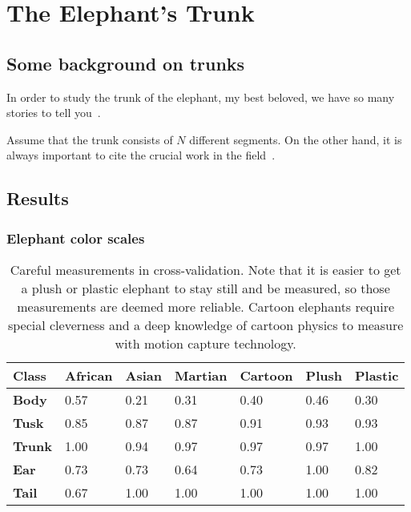 \chapter{The Elephant's Trunk} 

\label{chapter:chapter2}

\section{Some background on trunks} 

In order to study the trunk of the elephant, my best beloved, we have so many stories to tell you~\cite{kipling2010just}. 

Assume that the trunk consists of $N$ different segments. On the other hand, it is always important to cite the crucial work in the field~\cite{willems2007there}.


\section{Results} 


\subsection{Elephant color scales}

\begin{table}[htb!]
   \begin{center}
      \begin{tabular}{|l|l|l|l|l|l|l|} \hline
      {\bf Class} & {\bf African} & {\bf Asian}  & {\bf Martian}  & {\bf Cartoon}  & {\bf Plush} & {\bf Plastic} \\\hline
      {\bf Body} &  0.57  & 0.21 & 0.31 & 0.40 & 0.46 & 0.30 \\\hline
      {\bf Tusk} & 0.85 & 0.87 & 0.87 & 0.91 & 0.93 & 0.93 \\\hline
      {\bf Trunk} & 1.00  & 0.94 & 0.97 & 0.97 & 0.97 & 1.00 \\\hline
      {\bf Ear} & 0.73  & 0.73 & 0.64 & 0.73 & 1.00 & 0.82 \\\hline
      {\bf Tail} & 0.67 & 1.00 & 1.00 & 1.00 & 1.00 & 1.00 \\\hline
      \end{tabular}
   \end{center}
   \caption{Careful measurements in cross-validation. Note that it is easier to get a plush or plastic elephant to stay still and be measured, so those measurements are deemed more reliable. Cartoon elephants require special cleverness and a deep knowledge of cartoon physics to measure with motion capture technology.}
   \label{gpcr_coverage}
\end{table}




